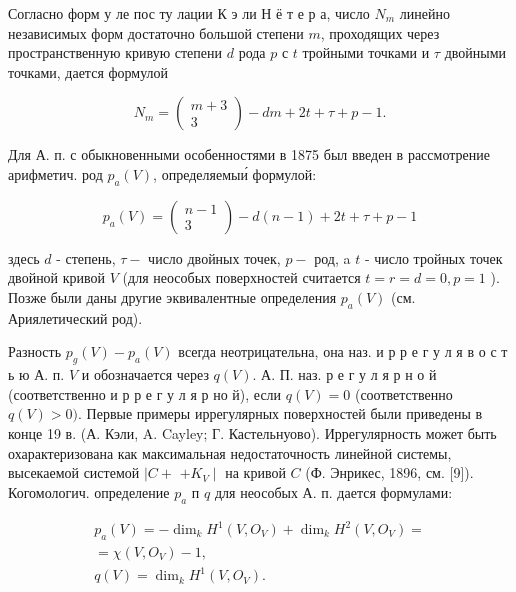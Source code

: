 \documentclass[10pt]{article}
\begin{document}
Согласно форм у ле пос ту лации К э ли Н ё т е р а, число $N_{m}$ линейно независимых форм достаточно большой степени $m$, проходящих через пространственную кривую степени $d$ рода $p$ с $t$ тройными точками и $\tau$ двойными точками, дается формулой



\[

N_{m}=\left(\begin{array}{c}

m+3 \\

3

\end{array}\right)-d m+2 t+\tau+p-1 .

\]



Для А. п. с обыкновенными особенностями в 1875 был введен в рассмотрение арифметич. род $p_{a}(V)$, определяемыи́ формулой:



\[

p_{a}(V)=\left(\begin{array}{c}

n-1 \\

3

\end{array}\right)-d(n-1)+2 t+\tau+p-1

\]



здесь $d$ - степень, $\tau-$ число двойных точек, $p-$ род, a $t$ - число тройных точек двойной кривой $V$ (для неособых поверхностей считается $t=r=d=0, p=1$ ). Позже были даны другие эквивалентные определения $p_{a}(V)$ (см. Ариялетический род).



Разность $p_{g}(V)-p_{a}(V)$ всегда неотрицательна, она наз. и р р е г у л я в о с т ь ю А. п. $V$ и обозначается через $q(V)$. А. П. наз. р е г у л я р н о й (соответственно и р р е г у л я р но й), если $q(V)=0$ (соответственно $q(V)>0)$. Первые примеры иррегулярных поверхностей были приведены в конце 19 в. (А. Кэли, A. Cayley; Г. Кастельнуово). Иррегулярность может быть охарактеризована как максимальная недостаточность линейной системы, высекаемой системой $\mid C+$ $+K_{V} \mid$ на кривой $C$ (Ф. Энрикес, 1896, см. [9]). Когомологич. определение $p_{a}$ п $q$ для неособых А. п. дается формулами:



\[

\begin{gathered}

p_{a}(V)=-\operatorname{dim}_{k} H^{1}\left(V, O_{V}\right)+\operatorname{dim}_{k} H^{2}\left(V, O_{V}\right)= \\

=\chi\left(V, O_{V}\right)-1, \\

q(V)=\operatorname{dim}_{k} H^{1}\left(V, O_{V}\right) .

\end{gathered}

\]
\end{document}
